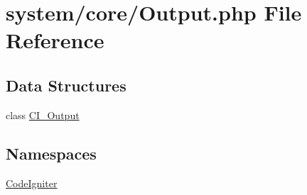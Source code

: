 \hypertarget{_output_8php}{\section{system/core/\-Output.php File Reference}
\label{_output_8php}
}
\subsection*{Data Structures}
\begin{DoxyCompactItemize}
\item 
class \hyperlink{class_c_i___output}{C\-I\-\_\-\-Output}
\end{DoxyCompactItemize}
\subsection*{Namespaces}
\begin{DoxyCompactItemize}
\item 
\hyperlink{namespace_code_igniter}{Code\-Igniter}
\end{DoxyCompactItemize}

